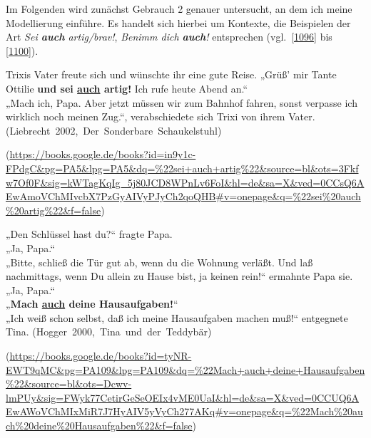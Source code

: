 Im Folgenden wird zunächst Gebrauch 2 genauer untersucht, an dem ich meine Modellierung einführe. Es handelt sich hierbei um Kontexte, die Beispielen der Art \textit{Sei \textbf{auch} artig/brav!}, \textit{Benimm dich \textbf{auch}!} entsprechen (vgl.\ \ref{1096} bis \ref{1100}).

\begin{exe}
	\ex\label{1096} 

 	Trixis Vater freute sich und wünschte ihr eine gute Reise. „Grüß' mir Tante Ottilie \textbf{und sei \ul{auch} artig!} Ich rufe heute Abend 		an.“\\	
	„Mach  ich, Papa. Aber jetzt müssen wir zum Bahnhof fahren, sonst verpasse ich wirklich noch meinen Zug.“, verabschiedete sich Trixi von 		ihrem Vater.
	\hfill\hbox{(Liebrecht 2002, Der Sonderbare Schaukelstuhl)}				 
  	\begin{sloppypar}
	{\scriptsize(\url{https://books.google.de/books?id=in9y1c-FPdgC\&pg=PA5\&lpg=PA5\&dq=\%22sei+auch+artig\%22\&source=bl\&ots=3Fkfw7Of0F\&sig=kWTagKqIg\_5j80JCD8WPnLv6FoI\&hl=de\&sa=X\&ved=0CCsQ6AEwAmoVChMIvcbX7PzGyAIVyPJyCh2qoQHB\#v=onepage\&q=\%22sei\%20auch\%20artig\%22\&f=false})}\end{sloppypar}
\end{exe}
\begin{exe}
	\ex\label{1097} 

 	„Den Schlüssel hast du?“ fragte Papa.\\
	„Ja, Papa.“\\
	„Bitte, schließ die Tür gut ab, wenn du die Wohnung verläßt. Und laß nachmittags, wenn Du allein zu Hause bist, ja keinen rein!“ ermahnte 		Papa sie.
	„Ja, Papa.“\\
	„\textbf{Mach \ul{auch} deine Hausaufgaben!}“\\
	„Ich weiß schon selbst, daß ich meine Hausaufgaben machen muß!“ entgegnete Tina.
	\newline
	\hbox{}\hfill\hbox{(Hogger 2000, Tina und der Teddybär)}				 
  	\begin{sloppypar}
	{\scriptsize(\url{https://books.google.de/books?id=tyNR-EWT9qMC\&pg=PA109\&lpg=PA109\&dq=\%22Mach+auch+deine+Hausaufgaben\%22\&source=bl\&ots=Dcwv-lmPUy\&sig=FWyk77CetirGeSeOEIx4vME0UaI\&hl=de\&sa=X\&ved=0CCUQ6AEwAWoVChMIxMiR7J7HyAIV5yVyCh277AKq\#v=onepage\&q=\%22Mach\%20auch\%20deine\%20Hausaufgaben\%22\&f=false})}\end{sloppypar}
\end{exe}						                              
						
